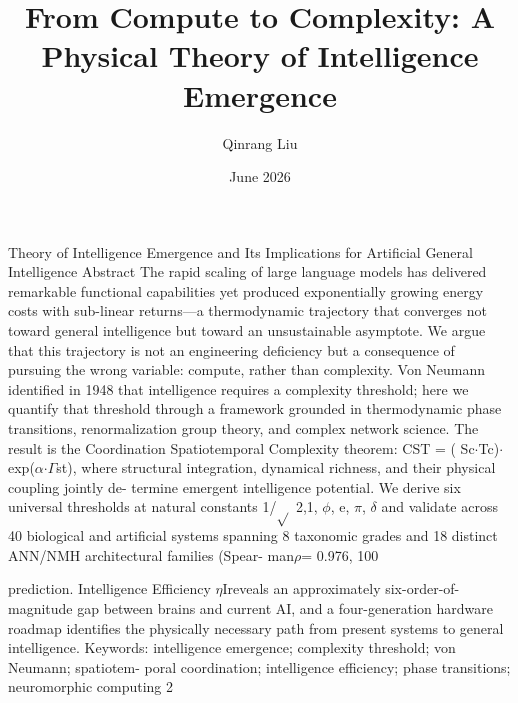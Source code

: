 \documentclass[a4paper,12pt]{article}
\title{From Compute to Complexity: A Physical Theory of Intelligence Emergence}
\author{Qinrang Liu}
\date{June 2026}
\begin{document}
\maketitle

Theory of Intelligence Emergence and Its Implications for Artificial General Intelligence Abstract The rapid scaling of large language models has delivered remarkable functional capabilities yet produced exponentially growing energy costs with sub-linear returns---a thermodynamic trajectory that converges not toward general intelligence but toward an unsustainable asymptote. We argue that this trajectory is not an engineering deficiency but a consequence of pursuing the wrong variable: compute,
rather than complexity. Von Neumann identified in 1948 that intelligence requires a complexity threshold; here we quantify that threshold through a framework grounded in thermodynamic phase transitions, renormalization group theory, and complex network science. The result is the Coordination Spatiotemporal Complexity theorem: CST = ( Sc$\cdot$Tc)$\cdot$exp($\alpha$$\cdot$$\Gamma$st), where structural integration, dynamical richness, and their physical coupling jointly de- termine emergent
intelligence potential. We derive six universal thresholds at natural constants {1/$\sqrt{}$ 2,1, $\phi$, e, $\pi$, $\delta$ }and validate across 40 biological and artificial systems spanning 8 taxonomic grades and 18 distinct ANN/NMH architectural families (Spear- man$\rho$= 0.976, 100%

prediction. Intelligence Efficiency $\eta$Ireveals an approximately six-order-of-magnitude gap between brains and current AI, and a four-generation hardware roadmap identifies the physically necessary path from present systems to general intelligence. Keywords: intelligence emergence; complexity threshold; von Neumann; spatiotem- poral coordination; intelligence efficiency; phase transitions; neuromorphic computing 2
\end{document}
